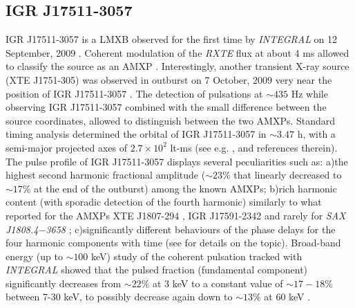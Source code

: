 \documentclass[graybox]{svmult}
\def \inte {{\em INTEGRAL\xspace}}
\def \rxte {{\em RXTE\xspace}}
\def \saxj{{\em SAX J1808.4$-$3658\xspace}}
\begin{document}

\subsection{IGR J17511-3057}

IGR J17511-3057 is a LMXB observed for the first time by \inte{} on 12 September, 2009 \cite{Baldovin2009}. Coherent modulation of the \rxte{} flux at about 4 ms allowed to classify the source as an AMXP \cite{Markwardt2010}. Interestingly, another transient X-ray source (XTE J1751-305) was observed in outburst on 7 October, 2009 very near the position of IGR J17511-3057 \cite{Chenevez2009,Falanga2011}. The detection of pulsations at $\sim 435$ Hz \cite{Markwardt2010} while observing IGR J17511-3057 combined with the small difference between the source coordinates, allowed to distinguish between the two AMXPs.
Standard timing analysis determined the orbital of IGR J17511-3057 in $\sim3.47$ h, with a semi-major projected axes of $2.7\times 10^2$ lt-ms (see e.g. \cite{Riggio2011}, and references therein). The pulse profile of IGR J17511-3057 displays several peculiarities such as: a)the highest second harmonic fractional amplitude ($\sim23\%$ that linearly decreased to $\sim17\%$ at the end of the outburst) among the known AMXPs; b)rich harmonic content (with sporadic detection of the fourth harmonic) similarly to what reported for the AMXPs XTE J1807-294 \cite{Patruno2010b}, IGR J17591-2342 \cite{Sanna2018c} and rarely for \saxj{} \cite{Hartman2008}; c)significantly different behaviours of the phase delays for the four harmonic components with time (see \cite{Riggio2011} for details on the topic). Broad-band energy (up to $\sim100$ keV) study of the coherent pulsation tracked with \inte{} showed that the pulsed fraction (fundamental component) significantly decreases from $\sim22$\% at 3 keV to a constant value of $\sim17-18$\% between 7-30 keV, to possibly decrease again down to $\sim13$\% at 60 keV \cite{Falanga2011}.
\end{document}
